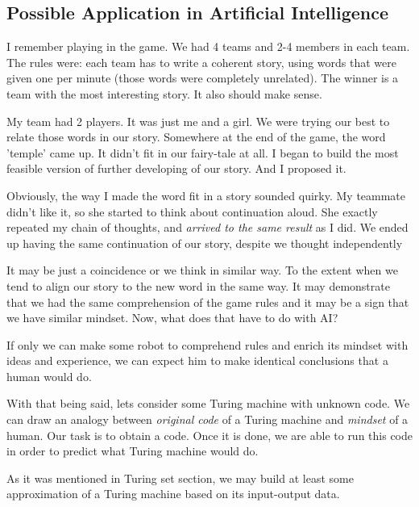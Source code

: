 \documentclass[12pt]{article}
\begin{document}
\subsection{Possible Application in Artificial Intelligence}
I remember playing in the game. We had 4 teams and 2-4 members in each team. The rules were: each team has to write a coherent story, using words that were given one per minute (those words were completely unrelated). The winner is a team with the most interesting story. It also should make sense.

My team had 2 players. It was just me and a girl. We were trying our best to relate those words in our story. Somewhere at the end of the game, the word 'temple' came up. It didn't fit in our fairy-tale at all. I began to build the most feasible version of further developing of our story. And I proposed it.

Obviously, the way I made the word fit in a story sounded quirky. My teammate didn't like it, so she started to think about continuation aloud. She exactly repeated my chain of thoughts, and \emph{arrived to the same result} as I did. We ended up having the same continuation of our story, despite we thought independently

It may be just a coincidence or we think in similar way. To the extent when we tend to align our story to the new word in the same way. It may demonstrate that we had the same comprehension of the game rules and it may be a sign that we have similar mindset. Now, what does that have to do with AI?

If only we can make some robot to comprehend rules and enrich its mindset with ideas and experience, we can expect him to make identical conclusions that a human would do.

With that being said, lets consider some Turing machine with unknown code. We can draw an analogy between \emph{original code} of a Turing machine and \emph{mindset} of a human. Our task is to obtain a code. Once it is done, we are able to run this code in order to predict what Turing machine would do.

As it was mentioned in \textsf{Turing set} section, we may build at least some approximation of a Turing machine based on its input-output data.
\end{document}
